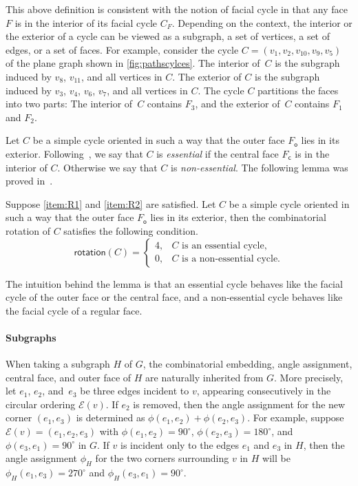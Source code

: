 \documentclass{theoretics}
\newcommand{\EE}{\mathcal{E}}
\newcommand{\FC}{F_\mathsf{c}}
\newcommand{\FO}{F_\mathsf{o}}
\newcommand{\rotation}{\mathsf{rotation}}
\begin{document}
This above definition is consistent with the notion of facial cycle in that any face $F$ is in the interior of its facial cycle $C_F$.
Depending on the context, the interior or the exterior of a cycle can be viewed as a subgraph, a set of vertices, a set of edges, or a set of faces. For example, consider the cycle $C=(v_1, v_2, v_{10}, v_9, v_5)$ of the plane graph shown in \cref{fig:pathscylces}. The interior of~$C$ is the subgraph induced by $v_8$, $v_{11}$, and all vertices in $C$. The exterior of $C$ is the subgraph induced by $v_3$, $v_{4}$, $v_6$, $v_7$, and all vertices in $C$. The cycle $C$ partitions the faces into two parts: The interior of~$C$ contains $F_3$, and the exterior of~$C$ contains $F_1$ and $F_2$.


Let $C$ be a simple cycle oriented in such a way that the outer face $\FO$ lies in its exterior.
Following~\cite{barth2023topology}, we say that  $C$ is \emph{essential} if the central face $\FC$ is in the interior  of $C$. Otherwise we say that  $C$ is \emph{non-essential}. The following lemma was proved in~\cite{barth2023topology}. 

\begin{lemma}\label{lem-prelim-cycle}
Suppose \ref{item:R1} and \ref{item:R2} are satisfied.
Let $C$ be a simple cycle oriented in such a way that the outer face $\FO$ lies in its exterior, then the combinatorial rotation of $C$ satisfies the following condition.
\[\rotation(C)=\begin{cases}
			4, & \text{$C$ is an essential cycle,}\\
            0, & \text{$C$ is a non-essential cycle.}
		 \end{cases}\]
\end{lemma}

The intuition behind the lemma is that an essential cycle behaves like the facial cycle of the outer face or the central face, and a non-essential cycle behaves like the facial cycle of a regular face.

\paragraph{Subgraphs} When taking a subgraph $H$ of $G$, the combinatorial embedding, angle assignment, central face, and outer face of $H$ are naturally inherited from $G$. More precisely, let $e_1$, $e_2$, and~$e_3$ be three edges incident to $v$, appearing consecutively in the circular ordering $\EE(v)$. If $e_2$ is removed, then the angle assignment for the new corner $(e_1, e_3)$ is determined as  $\phi(e_1, e_2) + \phi(e_2, e_3)$. For example, suppose $\EE(v) = (e_1, e_2, e_3)$ with $\phi(e_1, e_2) = 90^\circ$,  $\phi(e_2, e_3) = 180^\circ$, and $\phi(e_3, e_1) = 90^\circ$ in $G$. If $v$ is incident only to the edges $e_1$ and $e_3$ in $H$, then the angle assignment $\phi_H$ for the two corners surrounding $v$ in $H$ will be  $\phi_H(e_1, e_3) = 270^\circ$ and $\phi_H(e_3, e_1) = 90^\circ$. 
\end{document}
